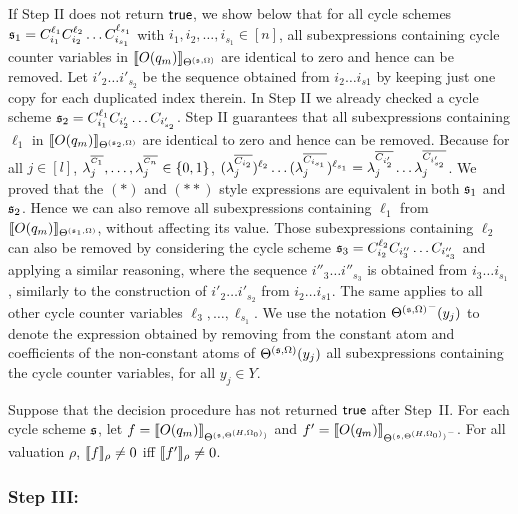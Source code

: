 If Step II does not return $\mathsf{true}$, we show below that for all cycle schemes ${\mathfrak{s} }_1=C_{i_1}^{\ell_1} C_{i_2}^{\ell_2} \dots C_{i_{s_1}}^{\ell_{s_1}}$ with $i_1,i_2,\dots,i_{s_1} \in [n]$, all subexpressions containing cycle counter variables in $\llbracket O(q_m)\rrbracket_{\Theta^{({\mathfrak{s} },\Omega)}}$ are identical to zero and hence can be removed. Let ${i'_2} \dots {i'_{s_2}}$ be the sequence obtained from $i_2 \dots i_{s1}$ by keeping just one copy for each duplicated index therein.  
In Step II we already checked a cycle scheme ${\mathfrak{s} }_2=C_{i_1}^{\ell_1} C_{i'_2} \dots C_{i'_{s_2}}$. Step II guarantees that all subexpressions containing $\ell_1$ in 
$\llbracket O(q_m)\rrbracket_{\Theta^{({\mathfrak{s} }_2,\Omega)}}$ are identical to zero and hence can be removed.
Because for all $j\in[l]$, $\lambda^{^{\overline{C_1}}}_j, \dots, \lambda^{^{\overline{C_n}}}_j \in \{0,1\}$,   $(\lambda^{\overline{C_{i_2}}}_{j})^{\ell_2} \dots (\lambda^{\overline{C_{i_{s_1}}}}_{j})^{\ell_{s_1}} = \lambda^{\overline{C_{i'_2}}}_{j} \dots \lambda^{\overline{C_{i'_{s_2}}}}_{j}$. We proved that the $(\ast)$ and $(\ast\ast)$ style expressions are equivalent in both ${\mathfrak{s} }_1$ and ${\mathfrak{s} }_2$.
Hence we can also remove all subexpressions containing $\ell_1$ from  $\llbracket O(q_m)\rrbracket_{\Theta^{({\mathfrak{s} }_1,\Omega)}}$, without affecting its value.
Those subexpressions containing $\ell_2$ can also be removed by considering the cycle scheme ${\mathfrak{s} }_3=C_{i_2}^{\ell_2} C_{i''_3} \dots C_{i''_{s_3}}$ and applying a similar reasoning, where the sequence ${i''_3} \dots {i''_{s_3}}$ is obtained from ${i_3} \dots  i_{s_1}$, similarly to the construction of ${i'_2} \dots {i'_{s_2}}$ from $i_2 \dots i_{s1}$. The same applies to all other cycle counter variables $\ell_3,\dots,\ell_{s_1}$.
We use the notation ${\Theta^{({\mathfrak{s} },\Omega)}}^-(y_j)$ to denote the expression obtained by removing from the constant atom and coefficients of the non-constant atoms of $\Theta^{({\mathfrak{s} },\Omega)}(y_j)$ all subexpressions containing the cycle counter variables, for all $y_j \in Y$. 

\begin{lemma}\label{prop-bnd-domain-1}
	Suppose that the decision procedure has not returned $\mathsf{true}$ after Step~II. For each cycle scheme ${\mathfrak{s} }$, let $f=\llbracket O(q_m)\rrbracket_{\Theta^{({\mathfrak{s} }, \Theta^{(H,\Omega_0)})}}$ and $f'=\llbracket O(q_m)\rrbracket_{{\Theta^{({\mathfrak{s} }, \Theta^{(H,\Omega_0)})}}^-}$. For all valuation $\rho$, $\llbracket f\rrbracket_{\rho}\neq 0$ iff $\llbracket f'\rrbracket_{\rho} \neq 0$.
\end{lemma}



\subsubsection{Step III:} 

